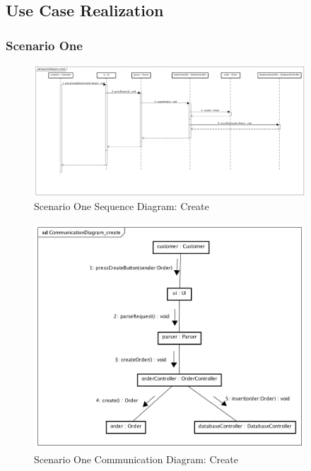 \documentclass[12pt]{scrreprt}
\begin{document}
\subsection{Use Case Realization}
\subsubsection{Scenario One}
\begin{figure}[H]
  \centering\includegraphics[width=4in]{DocumentRes/1SequenceDiagram_create.png}
  \caption{Scenario One Sequence Diagram: Create}
\end{figure}
\begin{figure}[H]
  \centering\includegraphics[width=4in]{DocumentRes/1CommunicationDiagram_create.png}
  \caption{Scenario One Communication Diagram: Create}
\end{figure}
\end{document}
